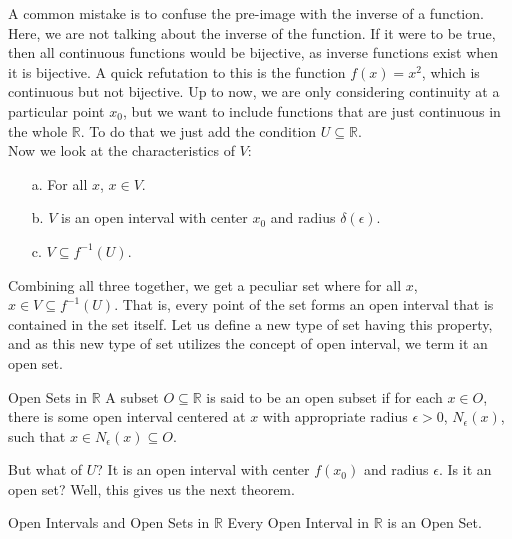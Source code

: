 A common mistake is to confuse the pre-image with the inverse of a function. Here, we are not talking about the inverse of the function. If it were to be true, then all continuous functions would be bijective, as inverse functions exist when it is bijective. A quick refutation to this is the function $f(x)=x^2$, which is continuous but not bijective.\newline
\noindent Up to now, we are only considering continuity at a particular point $x_0$, but we want to include functions that are just continuous in the whole $\mathbb{R}$. To do that we just add the condition $\boxed{U\subseteq \mathbb{R}}$.\\
Now we look at the characteristics of $V$:
\begin{enumerate}
    \item[a.] For all $x$, $x\in V$.
    \item[b.] $V$ is an open interval with center $x_0$ and radius $\delta(\epsilon)$.
    \item[c.] $V\subseteq f^{-1}(U)$.
\end{enumerate}
Combining all three together, we get a peculiar set where for all $x$, $x\in V\subseteq f^{-1}(U)$. That is, every point of the set forms an open interval that is contained in the set itself. Let us define a new type of set having this property, and as this new type of set utilizes the concept of open interval, we term it an open set.
\begin{Definition}{Open Sets in \(\mathbb{R}\)}
    A subset $O\subseteq\mathbb{R}$ is said to be an open subset if for each $x\in O$, there is some open interval centered at $x$ with appropriate radius $\epsilon>0$, $N_{\epsilon}(x)$, such that $x\in N_{\epsilon}(x)\subseteq O$.
\end{Definition}
\noindent But what of $U$? It is an open interval with center $f(x_0)$ and radius $\epsilon$. Is it an open set? Well, this gives us the next theorem.
\begin{Theorem}{Open Intervals and Open Sets in \(\mathbb{R}\)}\label{open_interval_open_sets}
    Every Open Interval in $\mathbb{R}$ is an Open Set.
\end{Theorem}
